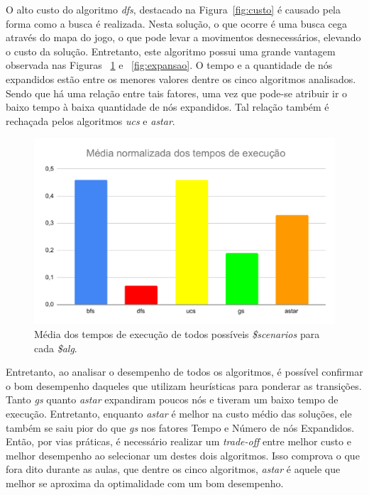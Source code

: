 \documentclass[12pt]{article}
\begin{document}
O alto custo do algoritmo \textit{dfs}, destacado na Figura~\ref{fig:custo} é
causado pela forma como a busca é realizada.
Nesta solução, o que ocorre é uma busca cega através do mapa do jogo, o que
pode levar a movimentos desnecessários, elevando o custo da solução.
Entretanto, este algoritmo possui uma grande vantagem observada nas Figuras
~\ref{fig:tempo} e ~\ref{fig:expansao}.
O tempo e a quantidade de nós expandidos estão entre os menores valores
dentre os cinco algoritmos analisados.
Sendo que há uma relação entre tais fatores, uma vez que pode-se atribuir ir o
baixo tempo à baixa quantidade de nós expandidos.
Tal relação também é rechaçada pelos algoritmos \textit{ucs} e \textit{astar}.

\begin{figure}[hbt!]
  \centering
  \includegraphics[width=.8\textwidth]{fig/tempo.pdf}
  \caption{Média dos tempos de execução de todos possíveis \textit{\$scenarios} para cada \textit{\$alg}.}
  \label{fig:tempo}
\end{figure}

Entretanto, ao analisar o desempenho de todos os algoritmos, é possível
confirmar o bom desempenho daqueles que utilizam heurísticas para
ponderar as transições.
Tanto \textit{gs} quanto \textit{astar} expandiram poucos nós e tiveram um baixo
tempo de execução.
Entretanto, enquanto \textit{astar} é melhor na custo médio das soluções, ele
também se saiu pior do que \textit{gs} nos fatores Tempo e Número de nós Expandidos.
Então, por vias práticas, é necessário realizar um \textit{trade-off} entre
melhor custo e melhor desempenho ao selecionar um destes dois algoritmos.
Isso comprova o que fora dito durante as aulas, que dentre os cinco
algoritmos, \textit{astar} é aquele que melhor se aproxima da optimalidade
com um bom desempenho.
\end{document}
